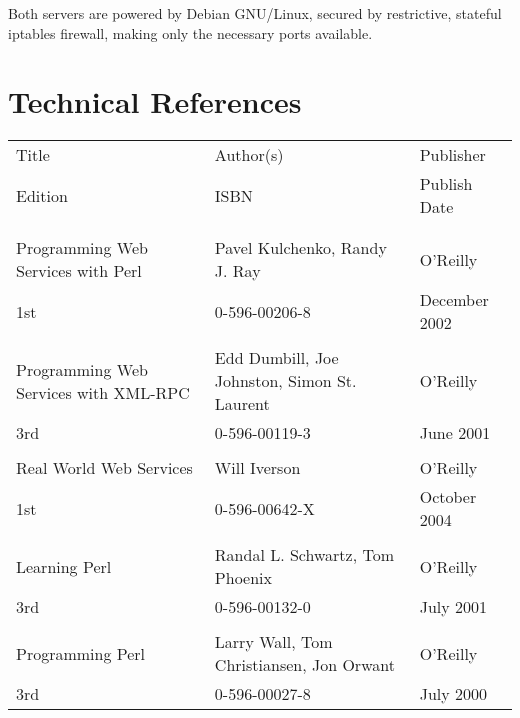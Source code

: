 \documentclass[a4paper,10pt]{article}
\begin{document}
Both servers are powered by Debian GNU/Linux, secured by restrictive, 
stateful iptables firewall, making only the necessary ports available.

\section{Technical References}

\begin{tabular}{lll}
Title	&	Author(s)	&	Publisher	\\
Edition	&	ISBN	&	Publish Date 	\\
			&			&						\\
			&			&						\\
Programming Web Services with Perl	&	Pavel Kulchenko,  Randy J. Ray	&
O'Reilly	\\
1st&	0-596-00206-8 & December 2002	\\
			&			&						\\
Programming Web Services with XML-RPC & Edd Dumbill, Joe Johnston, Simon
St. Laurent &	O'Reilly	\\
3rd & 0-596-00119-3	&	June 2001	\\
			&			&						\\
Real World Web Services	&	Will Iverson	&	O'Reilly	\\
1st & 0-596-00642-X	&	October 2004	\\
			&			&						\\
Learning Perl	&	Randal L. Schwartz, Tom Phoenix	&	O'Reilly	\\
3rd  		&	0-596-00132-0	&	July 2001	\\
			&			&						\\
Programming Perl	&	Larry Wall, Tom Christiansen, Jon Orwant	&
O'Reilly	\\
3rd		&	0-596-00027-8	&	July 2000	\\
\end{tabular}
\end{document}
